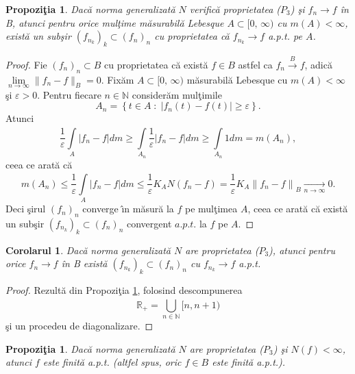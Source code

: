 \documentclass[ a4paper, 12pt]{report}
\newtheorem{prop}[theorem]{\bf Propozi\c tia }
\newtheorem{cor}[theorem]{\bf Corolarul}
\theoremstyle{definition}
\theoremstyle{remark}
\numberwithin{equation}{section}
\begin{document}
\begin{prop}\label{aptA}
Dac\u a norma generalizat\u a $N$ verific\u a proprietatea ($P_3$) \c si $f_n \rightarrow f$ \^in B, atunci pentru orice mul\c time m\u asurabil\u a Lebesque $A \subset [0, \, \infty)$ cu $m(A)<\infty$, exist\u a un sub\c sir $(f_{n_k})_k \subset (f_n)_n$ cu proprietatea c\u a $f_{n_k} \rightarrow f$ a.p.t. pe $A$.
\end{prop}

\begin{proof}
Fie $(f_n)_n \subset B$ cu proprietatea c\u a exist\u a $f \in B$ astfel ca  $f_n \xrightarrow{B} f$, adic\u a $\lim\limits_{n \to \infty} \lVert f_n-f \rVert_B = 0$.
Fix\u am $A \subset [0, \, \infty)$ m\u asurabil\u a Lebesque cu $m(A)<\infty$ \c si $\varepsilon>0$. Pentru fiecare $n \in \mathbb{N}$ consider\u am mul\c timile
$$A_n=\left\{ t \in A \; : \; \lvert f_n(t)-f(t) \rvert \geq \varepsilon \right\}.$$
Atunci
$$\frac{1}{\varepsilon} \int\limits_{A}^{}{\lvert f_n-f \rvert} dm \geq  \int\limits_{A_n}^{}{\frac{1}{\varepsilon} \lvert f_n-f \rvert} dm \geq \int\limits_{A_n}{}{1 dm} = m(A_n),$$
 ceea ce arat\u a c\u a
 $$m(A_n) \leq \frac{1}{\varepsilon} \int\limits_{A}^{}{\lvert f_n-f \rvert} dm \leq \frac{1}{\varepsilon} K_A N(f_n-f)=\frac{1}{\varepsilon} K_A {\lVert f_n-f \rVert}_B \xrightarrow[n \rightarrow \infty]{} 0.$$
Deci \c sirul $(f_n)_n$ converge \^\i n m\u asur\u a la $f$ pe mul\c timea $A$, ceea ce arat\u a c\u a exist\u a un sub\c sir $(f_{n_k})_k \subset (f_n)_n$ convergent $a.p.t.$ la $f$ pe $A$.
\end{proof}

\begin{cor}
Dac\u a norma generalizat\u a $N$ are proprietatea ($P_3$), atunci pentru orice $f_n \rightarrow f$ \^in B exist\u a $(f_{n_k})_k \subset (f_n)_n$ cu $f_{n_k} \rightarrow f$ a.p.t.
\end{cor}

\begin{proof}
Rezult\u a din Propozi\c tia \ref{aptA}, folosind descompunerea
$$\mathbb{R_+}=\bigcup\limits_{n \in \mathbb{N}}^{}{[n,n+1)}$$ \c si un procedeu de diagonalizare.
\end{proof}

\begin{prop}
Dac\u a norma generalizat\u a $N$ are proprietatea ($P_3$) \c si $N(f)<\infty$, atunci $f$ este finit\u a a.p.t. (altfel spus, oric $f \in B$ este finit\u a a.p.t.).
\end{prop}
\end{document}
